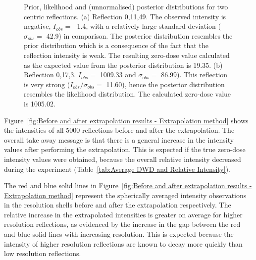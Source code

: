 \begin{figure}
        \caption[Prior, likelihood and (unnormalised) posterior distributions for two centric reflections.]{Prior, likelihood and (unnormalised) posterior distributions for two centric reflections.
		(a) Reflection 0,11,49. The observed intensity is negative, $I_{obs} =$ -1.4, with a relatively large standard deviation ($\sigma_{obs} =$ 42.9) in comparison.
		The posterior distribution resembles the prior distribution which is a consequence of the fact that the reflection intensity is weak.
		The resulting zero-dose value calculated as the expected value from the posterior distribution is 19.35.
		(b) Reflection 0,17,3. $I_{obs} =$ 1009.33 and $\sigma_{obs} =$ 86.99).
		This reflection is very strong ($I_{obs}/\sigma_{obs}  =$ 11.60), hence the posterior distribution resembles the likelihood distribution.
		The calculated zero-dose value is 1005.02.}
        \label{fig:Probabilistic distributions - Extrapolation method}
\end{figure}

Figure~\ref{fig:Before and after extrapolation results - Extrapolation method}  shows the intensities of all 5000 reflections before and after the extrapolation.
The overall take away message is that there is a general increase in the intensity values after performing the extrapolation.
This is expected if the true zero-dose intensity values were obtained, because the overall relative intensity decreased during the experiment (Table~\ref{tab:Average DWD and Relative Intensity}).

The red and blue solid lines in Figure~\ref{fig:Before and after extrapolation results - Extrapolation method} represent the spherically averaged intensity observations in the resolution shells before and after the extrapolation respectively.
The relative increase in the extrapolated intensities is greater on average for higher resolution reflections, as evidenced by the increase in the gap between the red and blue solid lines with increasing resolution.
This is expected because the intensity of higher resolution reflections are known to decay more quickly than low resolution reflections.

